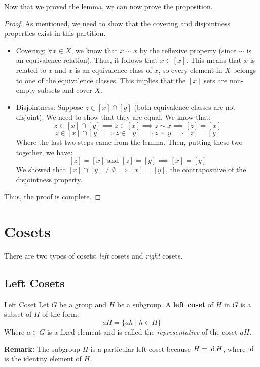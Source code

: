 \documentclass[letterpaper]{article}
\begin{document}
Now that we proved the lemma, we can now prove the proposition. 
\begin{mdframed}
    \begin{proof}
        As mentioned, we need to show that the covering and disjointness properties exist in this partition.
        \begin{itemize}
            \item \underline{Covering:} $\forall x \in X$, we know that $x \sim x$ by the reflexive property (since $\sim$ is an equivalence relation). Thus, it follows that $x \in [x]$. This means that $x$ is related to $x$ and $x$ is an equivalence class of $x$, so every element in $X$ belongs to one of the equivalence classes. This implies that the $[x]$ sets are non-empty subsets and cover $X$.
            \item \underline{Disjointness:} Suppose $z \in [x] \cap [y]$ (both equivalence classes are not disjoint). We need to show that they are equal. We know that:
            \[z \in [x] \cap [y] \implies z \in [x] \implies z \sim x \implies [z] = [x]\]
            \[z \in [x] \cap [y] \implies z \in [y] \implies z \sim y \implies [z] = [y]\]
            Where the last two steps came from the lemma. Then, putting these two together, we have:
            \[[z] = [x] \text{ and } [z] = [y] \implies [x] = [y]\]
            We showed that $[x] \cap [y] \neq \emptyset \implies [x] = [y]$, the contrapositive of the disjointness property. 
        \end{itemize}
        Thus, the proof is complete. 
    \end{proof}
\end{mdframed}











\newpage 
\section{Cosets}
There are two types of cosets: \emph{left} cosets and \emph{right} cosets. 

\subsection{Left Cosets}
\begin{definition}{Left Coset}{}
    Let $G$ be a group and $H$ be a subgroup. A \textbf{left coset} of $H$ in $G$ is a subset of $H$ of the form:  
    \[aH = \{ah \mid h \in H\}\]
    Where $a \in G$ is a fixed element and is called the \emph{representative} of the coset $aH$. 
\end{definition}
\textbf{Remark:} The subgroup $H$ is a particular left coset because $H = \operatorname{id} H$, where $\operatorname{id}$ is the identity element of $H$. 
\end{document}
